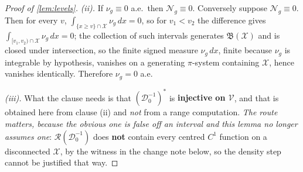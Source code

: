 \begin{proof}[Proof of \cref{lem:levels}]
\emph{(ii).} If $\nu_g\equiv0$ a.e.\ then $\mathcal N_g\equiv0$. Conversely suppose $\mathcal N_g\equiv0$.
Then for every $v$, $\int_{\{x\ge v\}\cap\mathcal X}\nu_g\,dx=0$, so for $v_1<v_2$ the difference gives
$\int_{[v_1,v_2)\cap\mathcal X}\nu_g\,dx=0$; the collection of such intervals generates
$\mathfrak B(\mathcal X)$ and is closed under intersection, so the finite signed measure $\nu_g\,dx$, finite
because $\nu_g$ is integrable by hypothesis, vanishes on a generating $\pi$-system containing
$\mathcal X$, hence vanishes identically. Therefore $\nu_g=0$ a.e.

\emph{(iii).} What the clause needs is that $(\mathcal D^{-1}_0)^{\ast}$ is \textbf{injective on
$\mathcal V$}, and that is obtained here from clause \textup{(ii)} and \emph{not} from a range
computation. \emph{The route matters, because the obvious one is false off an interval and this lemma no
longer assumes one}: $\mathcal R(\mathcal D^{-1}_0)$ does \textbf{not} contain every centred $C^{1}$
function on a disconnected $\mathcal X$, by the witness in the change note below, so the density step
cannot be justified that way.


\end{proof}
